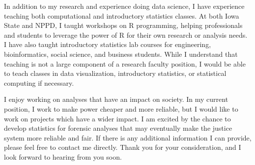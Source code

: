 \documentclass[12pt, letterpaper, sans]{moderncv}
\begin{document}
In addition to my research and experience doing data science, I have experience teaching both computational and introductory statistics classes. At both Iowa State and NPPD, I taught workshops on R programming, helping professionals and students to leverage the power of R for their own research or analysis needs. I have also taught introductory statistics lab courses for engineering, bioinformatics, social science, and business students. While I understand that teaching is not a large component of a research faculty position, I would be able to teach classes in data visualization, introductory statistics, or statistical computing if necessary. 

I enjoy working on analyses that have an impact on society. In my current position, I work to make power cheaper and more reliable, but I would like to work on projects which have a wider impact. I am excited by the chance to develop statistics for forensic analyses that may eventually make the justice system more reliable and fair. If there is any additional information I can provide, please feel free to contact me directly. Thank you for your consideration, and I look forward to hearing from you soon. 


\makeletterclosing
\end{document}
